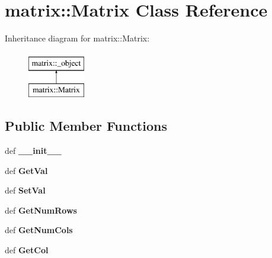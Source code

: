 \hypertarget{classmatrix_1_1Matrix}{
\section{matrix::Matrix Class Reference}
\label{dd/db9/classmatrix_1_1Matrix}
}
Inheritance diagram for matrix::Matrix:\begin{figure}[H]
\begin{center}
\leavevmode
\includegraphics[height=2cm]{dd/db9/classmatrix_1_1Matrix}
\end{center}
\end{figure}
\subsection*{Public Member Functions}
\begin{DoxyCompactItemize}
\item 
\hypertarget{classmatrix_1_1Matrix_af668028ba2f2859741988054da60ee75}{
def {\bfseries \_\-\_\-init\_\-\_\-}}
\label{dd/db9/classmatrix_1_1Matrix_af668028ba2f2859741988054da60ee75}

\item 
\hypertarget{classmatrix_1_1Matrix_a78af2756e24b6f0d74695956b2f02646}{
def {\bfseries GetVal}}
\label{dd/db9/classmatrix_1_1Matrix_a78af2756e24b6f0d74695956b2f02646}

\item 
\hypertarget{classmatrix_1_1Matrix_ae7b5ee268f12fb34ebbbe7213f91638a}{
def {\bfseries SetVal}}
\label{dd/db9/classmatrix_1_1Matrix_ae7b5ee268f12fb34ebbbe7213f91638a}

\item 
\hypertarget{classmatrix_1_1Matrix_a25ad06ac9533ca524f9f17734d6a1ad6}{
def {\bfseries GetNumRows}}
\label{dd/db9/classmatrix_1_1Matrix_a25ad06ac9533ca524f9f17734d6a1ad6}

\item 
\hypertarget{classmatrix_1_1Matrix_af4ec3fb39dcbec6b92df554051019e6d}{
def {\bfseries GetNumCols}}
\label{dd/db9/classmatrix_1_1Matrix_af4ec3fb39dcbec6b92df554051019e6d}

\item 
\hypertarget{classmatrix_1_1Matrix_a81fd68a34b15d0f2412818b39eaaf02c}{
def {\bfseries GetCol}}
\label{dd/db9/classmatrix_1_1Matrix_a81fd68a34b15d0f2412818b39eaaf02c}

\end{DoxyCompactItemize}
